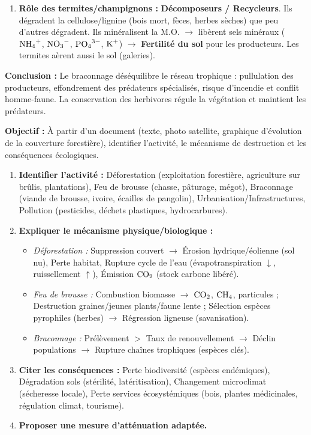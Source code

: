 \documentclass[11pt]{article}
\begin{document}
\begin{exoresolu}
\begin{enumerate}
        \item \textbf{Rôle des termites/champignons :} \textbf{Décomposeurs / Recycleurs}. Ils dégradent la cellulose/lignine (bois mort, fèces, herbes sèches) que peu d'autres dégradent. Ils minéralisent la M.O. $\rightarrow$ libèrent sels minéraux ($\ce{NH4+}$, $\ce{NO3-}$, $\ce{PO4^{3-}}$, $\ce{K+}$) $\rightarrow$ \textbf{Fertilité du sol} pour les producteurs. Les termites aèrent aussi le sol (galeries).
    \end{enumerate}
    \textbf{Conclusion :} Le braconnage déséquilibre le réseau trophique : pullulation des producteurs, effondrement des prédateurs spécialisés, risque d'incendie et conflit homme-faune. La conservation des herbivores régule la végétation et maintient les prédateurs.
\end{exoresolu}

\begin{methode}
    \textbf{Objectif :} À partir d'un document (texte, photo satellite, graphique d'évolution de la couverture forestière), identifier l'activité, le mécanisme de destruction et les conséquences écologiques.
    \begin{enumerate}
        \item \textbf{Identifier l'activité :} Déforestation (exploitation forestière, agriculture sur brûlis, plantations), Feu de brousse (chasse, pâturage, mégot), Braconnage (viande de brousse, ivoire, écailles de pangolin), Urbanisation/Infrastructures, Pollution (pesticides, déchets plastiques, hydrocarbures).
        \item \textbf{Expliquer le mécanisme physique/biologique :}
              \begin{itemize}
                  \item \textit{Déforestation :} Suppression couvert $\rightarrow$ Érosion hydrique/éolienne (sol nu), Perte habitat, Rupture cycle de l'eau (évapotranspiration $\downarrow$, ruissellement $\uparrow$), Émission $\ce{CO2}$ (stock carbone libéré).
                  \item \textit{Feu de brousse :} Combustion biomasse $\rightarrow$ $\ce{CO2}$, $\ce{CH4}$, particules ; Destruction graines/jeunes plants/faune lente ; Sélection espèces pyrophiles (herbes) $\rightarrow$ Régression ligneuse (savanisation).
                  \item \textit{Braconnage :} Prélèvement $>$ Taux de renouvellement $\rightarrow$ Déclin populations $\rightarrow$ Rupture chaînes trophiques (espèces clés).
              \end{itemize}
        \item \textbf{Citer les conséquences :} Perte biodiversité (espèces endémiques), Dégradation sols (stérilité, latéritisation), Changement microclimat (sécheresse locale), Perte services écosystémiques (bois, plantes médicinales, régulation climat, tourisme).
        \item \textbf{Proposer une mesure d'atténuation adaptée.}
    \end{enumerate}
\end{methode}
\end{document}
